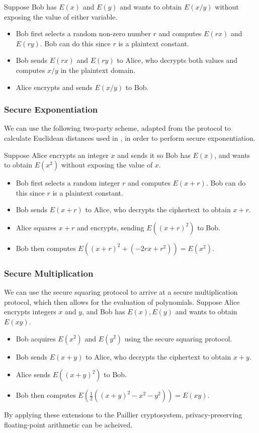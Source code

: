 Suppose Bob has $E\left(x\right)$ and $E\left(y\right)$ and wants to obtain $E\left(x/y\right)$ without exposing the value of either variable.
\begin{itemize}
	\item Bob first selects a random non-zero number $r$ and computes $E\left(rx\right)$ and $E\left(ry\right)$. Bob can do this since $r$ is a plaintext constant.
	\item Bob sends $E\left(rx\right)$ and $E\left(ry\right)$ to Alice, who decrypts both values and computes $x/y$ in the plaintext domain.
	\item Alice encrypts and sends $E\left(x/y\right)$ to Bob.
\end{itemize}

\subsubsection{Secure Exponentiation}
\label{ssec:exponentiationprotocol}
 We can use the following two-party scheme, adapted from the protocol to calculate Euclidean distances used in \cite{hutchison_privacy-preserving_2009}, in order to perform secure exponentiation. 

Suppose Alice encrypts an integer $x$ and sends it so Bob has $E\left(x\right)$, and wants to obtain $E\left(x^2\right)$ without exposing the value of $x$.
\begin{itemize}
	\item Bob first selects a random integer $r$ and computes $E\left(x+r\right)$. Bob can do this since $r$ is a plaintext constant.
	\item Bob sends $E\left(x+r\right)$ to Alice, who decrypts the ciphertext to obtain $x+r$.
	\item Alice squares $x+r$ and encrypts, sending $E\left(\left(x+r\right)^2\right)$ to Bob.
	\item Bob then computes $E\left( \left(x+r\right)^2 + (-2rx + r^2)\right) = E\left(x^2\right)$.
\end{itemize}

\subsubsection{Secure Multiplication}
We can use the secure squaring protocol to arrive at a secure multiplication protocol, which then allows for the evaluation of polynomials.
Suppose Alice encrypts integers $x$ and $y$, and Bob has $E\left(x\right), E\left(y\right)$ and wants to obtain $E\left(xy\right)$.
\begin{itemize}
	\item Bob acquires $E\left(x^2\right)$ and $E\left(y^2\right)$ using the secure squaring protocol.
	\item Bob sends $E\left(x+y\right)$ to Alice, who decrypts the ciphertext to obtain $x+y$.
	\item Alice sends $E\left(\left(x+y\right)^2\right)$ to Bob.
	\item Bob then computes $ E\left(\frac{1}{2} \left( \left(x+y\right)^2 - x^2 - y^2\right)\right) = E\left(xy\right)$.
\end{itemize}

By applying these extensions to the Paillier cryptosystem, privacy-preserving floating-point arithmetic can be acheived.
